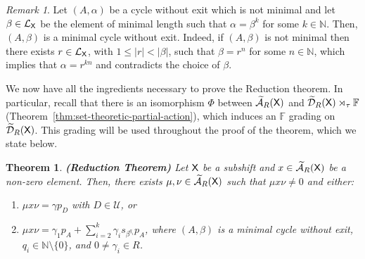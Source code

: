 \documentclass[a4paper,12pt]{amsart}
\newtheorem{theorem}[equation]{Theorem}
\theoremstyle{definition}
\theoremstyle{remark}
\newtheorem{remark}[equation]{Remark}
\numberwithin{equation}{section}
\newcommand{\osf}{{\normalfont \textsf{X}}}
\newcommand{\lang}{\CL_{\osf}}
\newcommand{\ualgshift}{\TCA_R(\osf)}
\newcommand{\udalgshift}{\TCD_R(\osf)}
\newcommand{\N}{\mathbb{N}}
\newcommand{\F}{\mathbb{F}}
\newcommand{\CA}{\mathcal{A}}
\newcommand{\CD}{\mathcal{D}}
\newcommand{\CL}{\mathcal{L}}
\newcommand{\TCA}{\widetilde{\CA}}
\newcommand{\TCB}{\mathcal{U}}
\newcommand{\TCD}{\widetilde{\CD}}
\begin{document}
\begin{remark}\label{minimal cycle} Let $(A,\alpha)$ be a cycle without exit which is not minimal and let $\beta\in \lang$ be the element of minimal length such that $\alpha=\beta^k$ for some $k\in \N$. Then, $(A, \beta)$ is a minimal cycle without exit. Indeed, if $(A,\beta)$ is not minimal then there exists $r\in \lang$, with $1\leq |r|<|\beta|$, such that $\beta=r^n$ for some $n\in \N$, which implies that $\alpha=r^{kn}$ and contradicts the choice of $\beta$.  \end{remark}

We now have all the ingredients necessary to prove the Reduction theorem. In particular, recall that there is an isomorphism $\Phi$ between $\ualgshift$ and $\udalgshift\rtimes_{\tau}\F$ (Theorem~\ref{thm:set-theoretic-partial-action}), which induces an $\F$ grading on $\udalgshift$. This grading will be used throughout the proof of the theorem, which we state below.



\begin{theorem}\label{reduction theorem} {\rm \textbf{(Reduction Theorem)}} Let $\osf$ be a subshift and $x\in \ualgshift$ be a non-zero element. Then, there exists $\mu,\nu\in \ualgshift$ such that  $\mu x\nu\neq 0$ and either:
\begin{enumerate}[\hspace{.3cm} \rm (1)]
    \item $\mu x\nu=\gamma p_D$ with $D\in \TCB$, or
    \item $\mu x\nu=\gamma_1 p_A +\sum\limits_{i=2}^k \gamma_i s_{\beta^{q_i}}p_A$, where $(A,\beta)$ is a minimal cycle without exit, $q_i\in \N\setminus \{0\}$, and $0\neq \gamma_i\in R$.
\end{enumerate}
 

\end{theorem}
\end{document}
